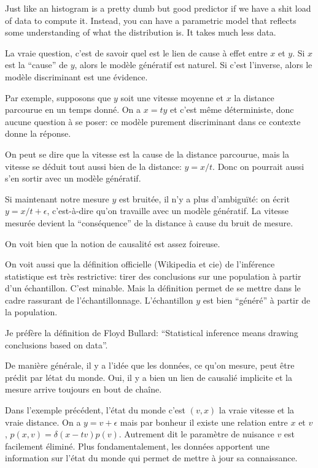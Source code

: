 \documentclass{article}
\begin{document}
Just like an histogram is a pretty dumb but good predictor if we have a shit load of data to compute it. Instead, you can have a parametric model that reflects some understanding of what the distribution is. It takes much less data.

La vraie question, c'est de savoir quel est le lien de cause \`a effet entre $x$ et $y$. Si $x$ est la ``cause'' de $y$, alors le mod\`ele g\'en\'eratif est naturel. Si c'est l'inverse, alors le mod\`ele discriminant est une \'evidence. 

Par exemple, supposons que $y$ soit une vitesse moyenne et $x$ la distance parcourue en un temps donn\'e. On a $x=t y$ et c'est m\^eme d\'eterministe, donc aucune question \`a se poser: ce mod\`ele purement discriminant dans ce contexte donne la r\'eponse. 

On peut se dire que la vitesse est la cause de la distance parcourue, mais la vitesse se d\'eduit tout aussi bien de la distance: $y=x/t$. Donc on pourrait aussi s'en sortir avec un mod\`ele g\'en\'eratif. 

Si maintenant notre mesure $y$ est bruit\'ee, il n'y a plus d'ambigu\"it\'e: on \'ecrit $y=x/t+\epsilon$, c'est-\`a-dire qu'on travaille avec un mod\`ele g\'en\'eratif. La vitesse mesur\'ee devient la ``cons\'equence'' de la distance \`a cause du bruit de mesure. 

On voit bien que la notion de causalit\'e est assez foireuse. 

On voit aussi que la d\'efinition officielle (Wikipedia et cie) de l'inf\'erence statistique est tr\`es restrictive: tirer des conclusions sur une population \`a partir d'un \'echantillon. C'est minable. Mais la d\'efinition permet de se mettre dans le cadre rassurant de l'\'echantillonnage. L'\'echantillon $y$ est bien ``g\'en\'er\'e'' \`a partir de la population.

Je pr\'ef\`ere la d\'efinition de Floyd Bullard: ``Statistical inference means drawing conclusions based on data''.

De mani\`ere g\'en\'erale, il y a l'id\'ee que les donn\'ees, ce qu'on mesure, peut \^etre pr\'edit par l\'etat du monde. Oui, il y a bien un lien de causali\'e implicite et la mesure arrive toujours en bout de cha\^ine.

Dans l'exemple pr\'ec\'edent, l'\'etat du monde c'est $(v,x)$ la vraie vitesse et la vraie distance. On a $y=v+\epsilon$ mais par bonheur il existe une relation entre $x$ et $v$, 
$p(x,v)=\delta(x-tv)p(v)$. Autrement dit le param\`etre de nuisance $v$ est facilement \'elimin\'e. Plus fondamentalement, les donn\'ees apportent une information sur l'\'etat du monde qui permet de mettre \`a jour sa connaissance.
\end{document}

